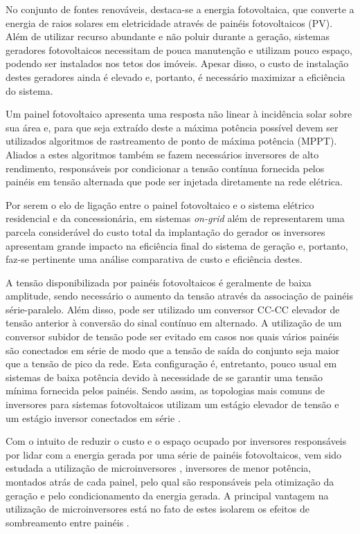 \documentclass[
	12pt,				%
	openany,
	onseside,
	a4paper,			%
	english,			%
	french,				%
	spanish,			%
	brazil,				%
	]{abntex2}
\begin{document}
	No conjunto de fontes renováveis, destaca-se a energia fotovoltaica, que converte a energia de raios solares em eletricidade 
	através de painéis fotovoltaicos (PV). Além de utilizar recurso abundante e não poluir durante a geração, sistemas geradores 
	fotovoltaicos necessitam de pouca manutenção e utilizam pouco espaço, podendo ser instalados nos tetos dos imóveis.
	Apesar disso, o custo de instalação destes geradores ainda é elevado e, portanto, é necessário maximizar a eficiência do 
	sistema. 	

	Um painel fotovoltaico apresenta uma resposta não linear à incidência solar sobre sua área e, para que seja extraído deste 
	a máxima potência possível devem ser utilizados algoritmos de rastreamento de ponto de máxima potência (MPPT). Aliados a 
	estes algoritmos também se fazem necessários inversores de alto rendimento, responsáveis por condicionar a tensão 
	contínua fornecida pelos painéis em tensão alternada que pode ser injetada diretamente na rede elétrica.
	
 
	Por serem o elo de ligação entre o painel fotovoltaico e o sistema elétrico residencial e da concessionária, em sistemas \textit{on-grid} além de representarem uma parcela considerável do custo total da implantação do gerador os inversores apresentam 
	grande impacto na eficiência final do sistema de geração e, portanto, faz-se pertinente uma análise comparativa de custo e eficiência destes.


	A tensão disponibilizada por painéis fotovoltaicos é geralmente de baixa amplitude, sendo necessário o aumento da tensão através da associação de painéis série-paralelo. Além disso, pode ser utilizado um conversor CC-CC elevador de tensão anterior à conversão do sinal contínuo em alternado. A utilização de um conversor subidor de tensão pode ser evitado em casos nos quais vários painéis são conectados em série de modo que a tensão de saída do conjunto seja maior que a tensão de pico da rede. Esta configuração  é, entretanto, pouco usual em sistemas de baixa potência devido à necessidade de se garantir uma tensão mínima fornecida pelos painéis. Sendo assim, as topologias mais comuns de inversores para sistemas fotovoltaicos utilizam um estágio elevador de tensão e um estágio inversor conectados em série \cite{LUIGIJUNIOR_ev_int}.

	Com o intuito de reduzir o custo e o espaço ocupado por inversores responsáveis por lidar com a energia gerada por uma série de painéis fotovoltaicos, vem sido estudada a utilização de microinversores \cite{Bouzguenda_smart_grid_inv}, inversores de menor potência, montados atrás de cada painel, pelo qual são responsáveis pela otimização da geração e pelo condicionamento da energia gerada. A principal vantagem na utilização de microinversores está no fato de estes isolarem os efeitos de sombreamento entre painéis \cite{Nezamuddin_des_eff_micro}.
\end{document}
